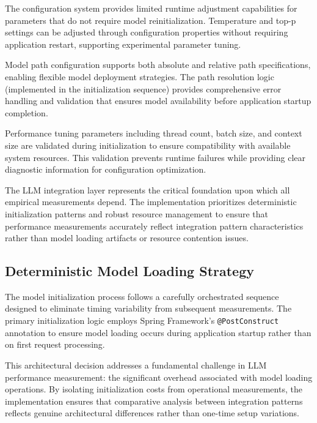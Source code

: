 The configuration system provides limited runtime adjustment capabilities for parameters that do not require model reinitialization. Temperature and top-p settings can be adjusted through configuration properties without requiring application restart, supporting experimental parameter tuning.

Model path configuration supports both absolute and relative path specifications, enabling flexible model deployment strategies. The path resolution logic (implemented in the initialization sequence) provides comprehensive error handling and validation that ensures model availability before application startup completion.

Performance tuning parameters including thread count, batch size, and context size are validated during initialization to ensure compatibility with available system resources. This validation prevents runtime failures while providing clear diagnostic information for configuration optimization.

The LLM integration layer represents the critical foundation upon which all empirical measurements depend. The implementation prioritizes deterministic initialization patterns and robust resource management to ensure that performance measurements accurately reflect integration pattern characteristics rather than model loading artifacts or resource contention issues.

\subsection{Deterministic Model Loading Strategy}

The model initialization process follows a carefully orchestrated sequence designed to eliminate timing variability from subsequent measurements. The primary initialization logic employs Spring Framework's \texttt{@PostConstruct} annotation to ensure model loading occurs during application startup rather than on first request processing.


This architectural decision addresses a fundamental challenge in LLM performance measurement: the significant overhead associated with model loading operations. By isolating initialization costs from operational measurements, the implementation ensures that comparative analysis between integration patterns reflects genuine architectural differences rather than one-time setup variations.

